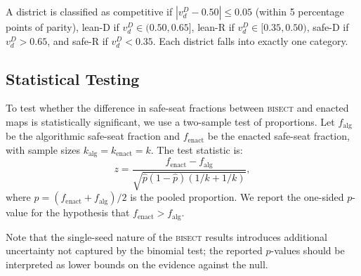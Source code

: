 A district is classified as competitive if $|v_d^D - 0.50| \leq 0.05$ (within 5
percentage points of parity), lean-D if $v_d^D \in (0.50, 0.65]$, lean-R if
$v_d^D \in [0.35, 0.50)$, safe-D if $v_d^D > 0.65$, and safe-R if $v_d^D < 0.35$.
Each district falls into exactly one category.

\subsection{Statistical Testing}

To test whether the difference in safe-seat fractions between \textsc{bisect} and
enacted maps is statistically significant, we use a two-sample test of proportions.
Let $f_\text{alg}$ be the algorithmic safe-seat fraction and $f_\text{enact}$ be
the enacted safe-seat fraction, with sample sizes $k_\text{alg} = k_\text{enact} = k$.
The test statistic is:
\[
  z = \frac{f_\text{enact} - f_\text{alg}}{\sqrt{\hat{p}(1-\hat{p})(1/k + 1/k)}},
\]
where $\hat{p} = (f_\text{enact} + f_\text{alg})/2$ is the pooled proportion.
We report the one-sided $p$-value for the hypothesis that $f_\text{enact} > f_\text{alg}$.

Note that the single-seed nature of the \textsc{bisect} results introduces additional
uncertainty not captured by the binomial test; the reported $p$-values should be
interpreted as lower bounds on the evidence against the null.
